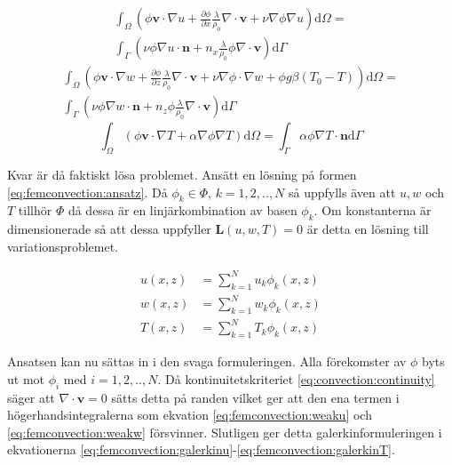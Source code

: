 \begin{align}
\int_\Omega \left(\phi\mathbf{v}\cdot\nabla u +
\frac{\partial \phi}{\partial x}\frac{\lambda}{\rho_0}\nabla\cdot\mathbf{v}
+\nu\nabla\phi\nabla u\right)\mathrm{d}\Omega = \nonumber \\
\int_\Gamma\left( \nu\phi\nabla u\cdot\mathbf{n} +
n_x\frac{\lambda}{\rho_0}\phi\nabla\cdot\mathbf{v}\right)\mathrm{d}\Gamma
\label{eq:femconvection:weaku}
\end{align}
\begin{align}
\int_\Omega\left(\phi\mathbf{v}\cdot\nabla w
+ \frac{\partial \phi}{\partial z} \frac{\lambda}{\rho_0}\nabla\cdot\mathbf{v}
+ \nu\nabla\phi\cdot\nabla w + \phi g\beta(T_0-T)\right)\mathrm{d}\Omega
= \nonumber \\
\int_\Gamma\left(\nu\phi\nabla w\cdot\mathbf{n} +
n_z\phi\frac{\lambda}{\rho_0}\nabla\cdot\mathbf{v}\right)\mathrm{d}\Gamma
\label{eq:femconvection:weakw}
\end{align}
\begin{equation}
\int_\Omega\left(\phi\mathbf{v}\cdot\nabla T + \alpha\nabla\phi\nabla T\right)\mathrm{d}\Omega
= \int_\Gamma \alpha\phi\nabla T\cdot\mathbf{n}\mathrm{d}\Gamma
\label{eq:femconvection:weakT}
\end{equation}


\noindent
Kvar är då faktiskt lösa problemet.
Ansätt en lösning på formen \eqref{eq:femconvection:ansatz}.
Då $\phi_k \in \Phi$, $k=1,2,..,N$ så uppfylls även att $u,w$ och $T$ tillhör
$\Phi$ då dessa är en linjärkombination av basen $\phi_k$. Om konstanterna
är dimensionerade så att dessa uppfyller $\mathbf{L}(u,w,T) = 0$ är detta
en lösning till variationsproblemet. \cite{johnson2009}\cite{heath2002}\cite{lewis04}

\begin{align}
u(x,z) &= \sum^N_{k=1}u_k\phi_k(x,z)
\nonumber \\
w(x,z) &= \sum^N_{k=1}w_k\phi_k(x,z)
\nonumber \\
T(x,z) &= \sum^N_{k=1}T_k\phi_k(x,z)
\label{eq:femconvection:ansatz}
\end{align}

\noindent
Ansatsen kan nu sättas in i den svaga formuleringen.
Alla förekomster av $\phi$ byts ut mot $\phi_i$ med $i=1,2,..,N$. Då
kontinuitetskriteriet \eqref{eq:convection:continuity} säger att
$\nabla\cdot\mathbf{v} = 0$ sätts detta på randen vilket ger att den
ena termen i högerhandsintegralerna som ekvation \eqref{eq:femconvection:weaku} och
\eqref{eq:femconvection:weakw}
försvinner. Slutligen ger
detta galerkinformuleringen i ekvationerna
\eqref{eq:femconvection:galerkinu}-\eqref{eq:femconvection:galerkinT}.

